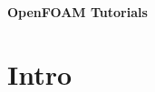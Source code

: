 \documentclass{article}
\begin{document}
	

\noindent
\begin{huge}
\hspace{-3.0mm}\textbf{OpenFOAM Tutorials}
\end{huge}

\section{Intro}
	
\end{document}
